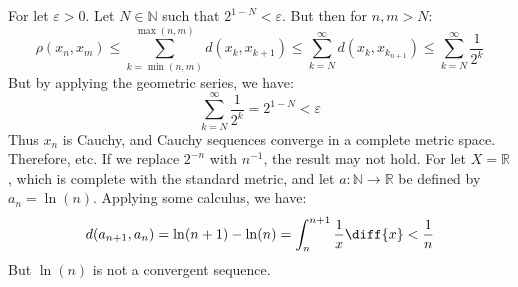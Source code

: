 \documentclass[crop=false,class=article,oneside]{standalone}
\begin{document}
    \begin{solution}
        For let $\varepsilon>0$. Let $N\in\mathbb{N}$ such that
        $2^{1-N}<\varepsilon$. But then for $n,m>N$:
        \begin{equation}
            \rho(x_{n},x_{m})\leq
            \sum_{k=\min(n,m)}^{\max(n,m)}d(x_{k},x_{k+1})
            \leq\sum_{k=N}^{\infty}d(x_{k},x_{k_{n+1}})
            \leq\sum_{k=N}^{\infty}\frac{1}{2^{k}}
        \end{equation}
        But by applying the geometric series, we have:
        \begin{equation}
            \sum_{k=N}^{\infty}\frac{1}{2^{k}}=2^{1-N}<\varepsilon
        \end{equation}
        Thus $x_{n}$ is Cauchy, and Cauchy sequences converge in a
        complete metric space. Therefore, etc. If we replace
        $2^{\minus{n}}$ with $n^{\minus{1}}$, the result may not hold.
        For let $X=\mathbb{R}$, which is complete with the standard
        metric, and let $a:\mathbb{N}\rightarrow\mathbb{R}$ be defined
        by $a_{n}=\ln(n)$. Applying some calculus, we have:
        \begin{equation}
            d(a_{n+1},a_{n})=\ln(n+1)-\ln(n)
            =\int_{n}^{n+1}\frac{1}{x}\diff{x}<\frac{1}{n}
        \end{equation}
        But $\ln(n)$ is not a convergent sequence.
    \end{solution}
\end{document}
